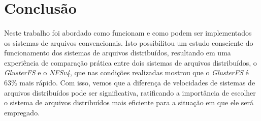 \section{Conclusão}
\paragraph{}Neste trabalho foi abordado como funcionam e como podem ser implementados os sistemas de arquivos convencionais. Isto possibilitou um estudo consciente do funcionamento dos sistemas de arquivos distribuídos, resultando em uma experiência de comparação prática entre dois sistemas de arquivos distribuídos, o \textit{GlusterFS} e o \textit{NFSv4}, que nas condições realizadas mostrou que o \textit{GlusterFS} é 63\% mais rápido. Com isso, vemos que a diferença de velocidades de sistemas de arquivos distribuídos pode ser significativa, ratificando a importância de escolher o sistema de arquivos distribuídos mais eficiente para a situação em que ele será empregado.
